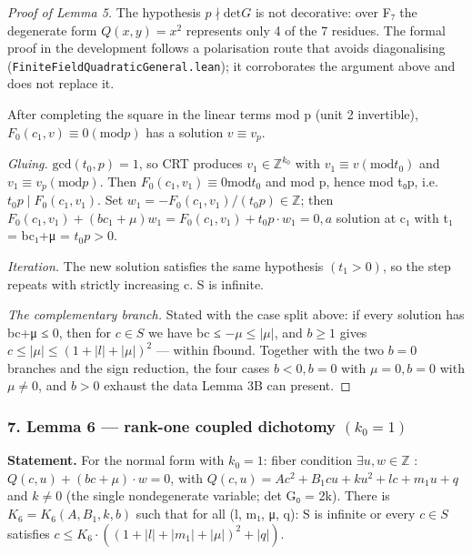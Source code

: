 \begin{proof}[Proof of Lemma 5]
The hypothesis $p ∤ \mathrm{det} G$ is not decorative: over F₇ the degenerate form $Q(x,y) = x^{2}$ represents only 4 of the 7 residues. The formal proof in the development follows a polarisation route that avoids diagonalising (\texttt{FiniteFieldQuadraticGeneral.\allowbreak{}lean}); it corroborates the argument above and does not replace it.

After completing the square in the linear terms mod p (unit 2 invertible), $F_{0}(c_{1}, v) ≡ 0 (\mathrm{mod} p)$ has a solution $v ≡ v_{p}$.

\emph{Gluing.} $\mathrm{gcd}(t_{0}, p) = 1$, so CRT produces $v_{1} ∈ ℤ^{k_{0}}$ with $v_{1} ≡ v (\mathrm{mod} t_{0})$ and $v_{1} ≡ v_{p} (\mathrm{mod} p)$. Then $F_{0}(c_{1}, v_{1}) ≡ 0 \mathrm{mod} t_{0}$ and mod p, hence mod t₀p, i.e. $t_{0}p ∣ F_{0}(c_{1}, v_{1})$. Set $w_{1} = −F_{0}(c_{1}, v_{1})/(t_{0}p) ∈ ℤ$; then $F_{0}(c_{1}, v_{1}) + (bc_{1}+μ)w_{1} = F_{0}(c_{1}, v_{1}) + t_{0}p·w_{1} = 0, a$ solution at c₁ with t₁ = bc₁+μ = $t_{0}p > 0$.

\emph{Iteration.} The new solution satisfies the same hypothesis $(t_{1} > 0)$, so the step repeats with strictly increasing c. S is infinite.

\emph{The complementary branch.} Stated with the case split above: if every solution has bc+μ ≤ 0, then for $c ∈ S$ we have bc ≤ $−μ ≤ |μ|$, and $b ≥ 1$ gives $c ≤ |μ| ≤ (1+|l|+|μ|)^{2}$ — within fbound. Together with the two $b = 0$ branches and the sign reduction, the four cases $b < 0, b = 0$ with $μ = 0, b = 0$ with $μ ≠ 0$, and $b > 0$ exhaust the data Lemma 3B can present.

\end{proof}
\subsubsection*{7. Lemma 6 — rank-one coupled dichotomy $(k_{0} = 1)$}
\textbf{Statement.} For the normal form with $k_{0} = 1$: fiber condition $∃ u, w ∈ ℤ$ : $Q(c,u) + (bc+μ)·w = 0$, with $Q(c,u) = A c^{2} + B_{1} c u + k u^{2} + l c + m_{1} u + q$ and $k ≠ 0$ (the single nondegenerate variable; det G₀ = 2k). There is $K_{6} = K_{6}(A, B_{1}, k, b)$ such that for all (l, m₁, μ, q): S is infinite or every $c ∈ S$ satisfies $c ≤ K_{6}·((1+|l|+|m_{1}|+|μ|)^{2}+|q|)$.

